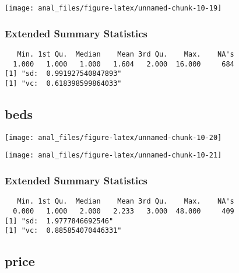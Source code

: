 \begin{center}\texttt{[image: anal\_files/figure-latex/unnamed-chunk-10-19]} \end{center}

\hypertarget{extended-summary-statistics-2}{%
\subsubsection{Extended Summary
Statistics}\label{extended-summary-statistics-2}}

\begin{verbatim}   Min. 1st Qu.  Median    Mean 3rd Qu.    Max.    NA's 
  1.000   1.000   1.000   1.604   2.000  16.000     684 
[1] "sd:  0.991927540847893"
[1] "vc:  0.618398599864033"
\end{verbatim}

\pagebreak

\centering

\hypertarget{beds}{%
\subsection{beds}\label{beds}}

\begin{center}\texttt{[image: anal\_files/figure-latex/unnamed-chunk-10-20]} \end{center}

\begin{center}\texttt{[image: anal\_files/figure-latex/unnamed-chunk-10-21]} \end{center}

\hypertarget{extended-summary-statistics-3}{%
\subsubsection{Extended Summary
Statistics}\label{extended-summary-statistics-3}}

\begin{verbatim}   Min. 1st Qu.  Median    Mean 3rd Qu.    Max.    NA's 
  0.000   1.000   2.000   2.233   3.000  48.000     409 
[1] "sd:  1.9777846692546"
[1] "vc:  0.885854070446331"
\end{verbatim}

\pagebreak

\centering

\hypertarget{price}{%
\subsection{price}\label{price}}


